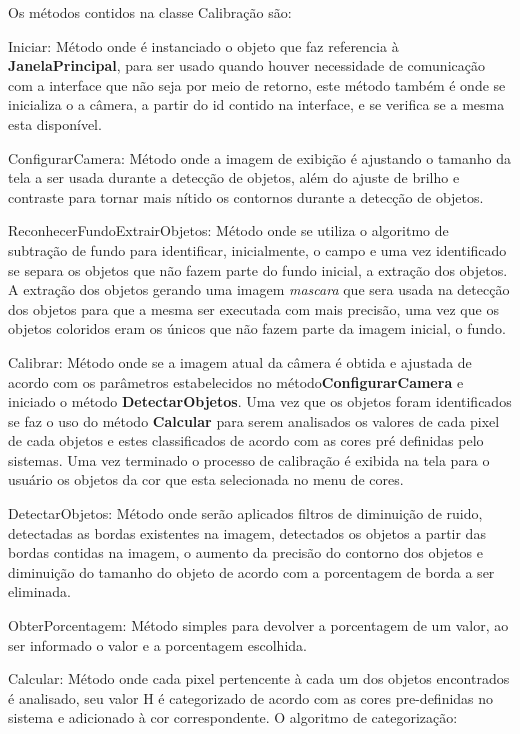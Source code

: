 Os métodos contidos na classe Calibração são:
	\begin{description}

\item Iniciar: Método onde é instanciado o objeto que faz referencia à \textbf{JanelaPrincipal}, para ser usado quando houver necessidade de comunicação com a interface que não seja por meio de retorno, este método também é onde se inicializa o a câmera, a partir do id contido na interface, e se verifica se a mesma esta disponível.


\item ConfigurarCamera: Método onde a imagem de exibição é ajustando o tamanho da tela a ser usada durante a detecção de objetos, além do ajuste de brilho e contraste para tornar mais nítido os contornos durante a detecção de objetos.	
	
  \item ReconhecerFundoExtrairObjetos: Método onde se utiliza o algoritmo de subtração de fundo para identificar, inicialmente, o campo e uma vez identificado se separa os objetos que não fazem parte do fundo inicial, a extração dos objetos. A extração dos objetos gerando uma imagem \textit{mascara} que sera usada na detecção dos objetos para que a mesma ser executada com mais precisão, uma vez que os objetos coloridos eram os únicos que não fazem parte da imagem inicial, o fundo.
  
 
	\item Calibrar: Método onde se a imagem atual da câmera é obtida e ajustada de acordo com os parâmetros estabelecidos no método\textbf{ConfigurarCamera} e iniciado o método \textbf{DetectarObjetos}. Uma vez que os objetos foram identificados se faz o uso do método \textbf{Calcular}  para serem analisados os valores de cada pixel de cada objetos e estes classificados de acordo com as cores pré definidas pelo sistemas. Uma vez terminado o processo de calibração é exibida na tela para o usuário os objetos da cor que esta selecionada no menu de cores.			
		
	\item DetectarObjetos: Método onde serão aplicados filtros de diminuição de ruido, detectadas as bordas existentes na imagem, detectados os objetos a partir das bordas contidas na imagem, o aumento da precisão do contorno dos objetos e diminuição do tamanho do objeto de acordo com a porcentagem de borda a ser eliminada. 

	\item ObterPorcentagem: Método simples para devolver a porcentagem de um valor, ao ser informado o valor e a porcentagem escolhida.
		
		\item Calcular: Método onde cada pixel pertencente à cada um dos objetos encontrados é analisado, seu valor H é categorizado de acordo com as cores pre-definidas no sistema e adicionado à cor correspondente.
		O algoritmo de categorização:
 
	
		\end{description}	

